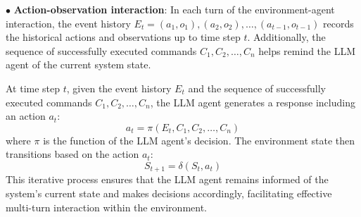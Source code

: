 $\bullet$ \textbf{Action-observation interaction}:
In each turn of the environment-agent interaction, the event history $E_t = {(a_1, o_1), (a_2, o_2), \ldots, (a_{t-1}, o_{t-1})}$ records the historical actions and observations up to time step $t$. Additionally, the sequence of successfully executed commands ${C_1, C_2, \ldots, C_n}$ helps remind the LLM agent of the current system state.

At time step $t$, given the event history $E_t$ and the sequence of successfully executed commands $C_1, C_2, \dots, C_n$, the LLM agent generates a response including an action $a_t$:
\begin{equation}
    a_t = \pi(E_t, {C_1, C_2, \ldots, C_n})
\end{equation}
where $\pi$ is the function of the LLM agent's decision.
The environment state then transitions based on the action $a_t$:
\begin{equation}
    S_{t+1} = \delta(S_t, a_t)
\end{equation}
This iterative process ensures that the LLM agent remains informed of the system's current state and makes decisions accordingly, facilitating effective multi-turn interaction within the environment. 




